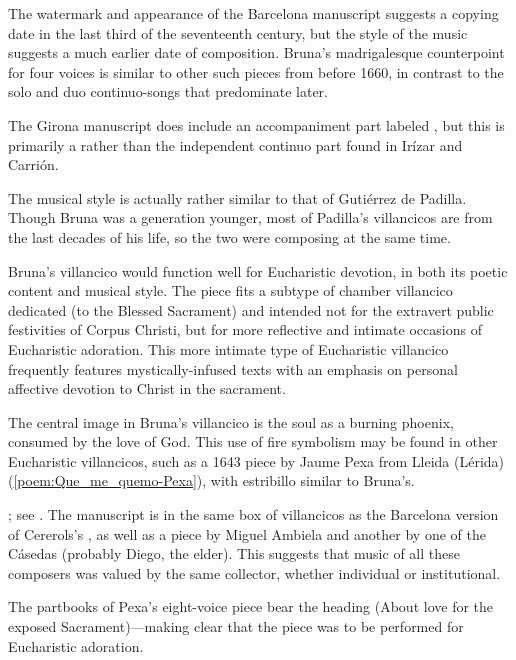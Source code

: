 The watermark and appearance of the Barcelona manuscript suggests a copying
date in the last third of the seventeenth century, but the style of the music
suggests a much earlier date of composition.%
Bruna's madrigalesque counterpoint for four voices is similar to other such
pieces from before 1660, in contrast to the solo and duo continuo-songs that
predominate later.%
\begin{Footnote}
    The Girona manuscript does include an accompaniment part labeled
    , but this is primarily a  rather
    than the independent continuo part found in Irízar and Carrión.
\end{Footnote}
The musical style is actually rather similar to that of Gutiérrez de Padilla. 
Though Bruna was a generation younger, most of Padilla's villancicos are from
the last decades of his life, so the two were composing at the same time.

Bruna's villancico would function well for Eucharistic devotion, in both its
poetic content and musical style.  
The piece fits a subtype of chamber villancico dedicated  (to the Blessed Sacrament) and intended not for the extravert
public festivities of Corpus Christi, but for more reflective and intimate
occasions of Eucharistic adoration.
This more intimate type of Eucharistic villancico frequently features
mystically-infused texts with an emphasis on personal affective devotion to
Christ in the sacrament.  

The central image in Bruna's villancico is the soul as a burning phoenix,
consumed by the love of God.
This use of fire symbolism may be found in other Eucharistic villancicos, such
as a 1643 piece by Jaume Pexa from Lleida (Lérida)
(\cref{poem:Que_me_quemo-Pexa}), with estribillo similar to Bruna's.%
\begin{Footnote}
    ; see .
    The manuscript is in the same box of villancicos as the Barcelona version
    of Cererols's , as well as a piece by Miguel
    Ambiela and another by one of the Cásedas (probably Diego, the elder).  
    This suggests that music of all these composers was valued by the same
    collector, whether individual or institutional.
\end{Footnote}
The partbooks of Pexa's eight-voice piece bear the heading  (About love for the exposed Sacrament)---making clear that
the piece was to be performed for Eucharistic adoration.  

